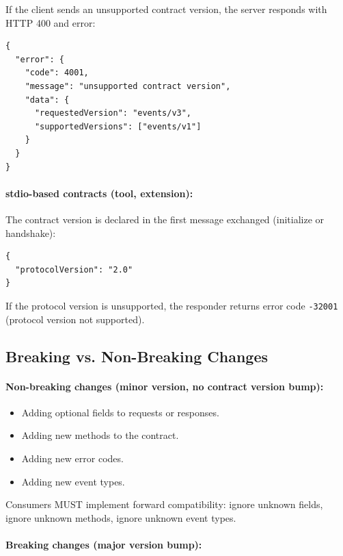 If the client sends an unsupported contract version, the server responds with
HTTP 400 and error:

\begin{verbatim}
{
  "error": {
    "code": 4001,
    "message": "unsupported contract version",
    "data": {
      "requestedVersion": "events/v3",
      "supportedVersions": ["events/v1"]
    }
  }
}
\end{verbatim}

\paragraph{stdio-based contracts (tool, extension):}

The contract version is declared in the first message exchanged (initialize or
handshake):

\begin{verbatim}
{
  "protocolVersion": "2.0"
}
\end{verbatim}

If the protocol version is unsupported, the responder returns error code
\texttt{-32001} (protocol version not supported).

\subsection{Breaking vs. Non-Breaking Changes}

\paragraph{Non-breaking changes (minor version, no contract version bump):}

\begin{itemize}
  \item Adding optional fields to requests or responses.
  \item Adding new methods to the contract.
  \item Adding new error codes.
  \item Adding new event types.
\end{itemize}

Consumers MUST implement forward compatibility: ignore unknown fields, ignore
unknown methods, ignore unknown event types.

\paragraph{Breaking changes (major version bump):}

